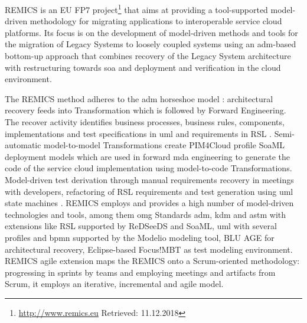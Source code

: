 REMICS \autocite{Krasteva2013REMICSAgile,Wendland2013REMICS,REMICS2013RecoverPrinciples,REMICS2013Migrate,Remics2013RecoverToolkit,Mohagheghi2011REMICS,Sadovykh2011REMICS,Mohagheghi2010REMICS} is an EU FP7 project\footnote{\url{http://www.remics.eu} Retrieved: 11.12.2018} that aims at providing a tool-supported model-driven methodology for migrating  applications to interoperable service cloud platforms.
Its focus is on the development of model-driven methods and tools for the migration of \glspl{Legacy System} to loosely coupled systems using an \gls{adm}-based bottom-up approach that combines recovery of the \gls{Legacy System} architecture with restructuring towards \gls{soa} and deployment and verification in the cloud environment.

The REMICS  method adheres to the \gls{adm} horseshoe model \autocite{Perez-Castillo2011KDM,Perez-Castillo2011MARBLE,Khusidman2007}: architectural recovery feeds into \gls{Transformation} which is followed by \gls{Forward Engineering}.
The recover activity identifies business processes, business rules, components, implementations and test specifications in \gls{uml} and requirements in RSL \autocite{REMICS2013Migrate}.
Semi-automatic model-to-model \glspl{Transformation} create PIM4Cloud profile SoaML deployment models which are used in forward \gls{mda} \autocite{OMG2014MDA} engineering to generate the code of the service cloud implementation using model-to-code \glspl{Transformation}.
Model-driven test derivation through manual requirements recovery in meetings with  developers, refactoring of RSL requirements and test generation using \gls{uml} state machines \autocite{Wendland2013REMICS}.
REMICS employs and provides a high number of model-driven technologies and tools, among them \gls{omg} Standards \gls{adm}, \gls{kdm} and \gls{astm} with extensions like RSL supported by ReDSeeDS and SoaML, \gls{uml} with several profiles and \gls{bpmn} supported by the Modelio modeling tool, BLU AGE for architectural recovery, Eclipse-based Focus!MBT as test modeling environment.
REMICS agile extension \autocite{Krasteva2013REMICSAgile} maps the REMICS onto a Scrum-oriented methodology: progressing in  sprints by  teams and employing meetings and artifacts from Scrum, it employs an iterative, incremental and agile model.

